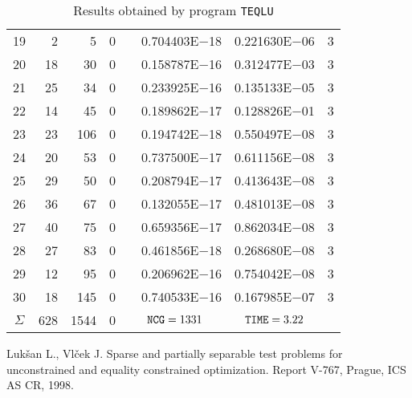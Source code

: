 \documentclass{esub2acm}
\begin{document}
\begin{table}
\begin{tabular}{c|rrrr@{}lcc}
19  &   2   &   5   &   0   &       &   0.704403E$-$18  &   0.221630E$-$06  &   3   \\
20  &   18  &   30  &   0   &       &   0.158787E$-$16  &   0.312477E$-$03  &   3   \\
21  &   25  &   34  &   0   &       &   0.233925E$-$16  &   0.135133E$-$05  &   3   \\
22  &   14  &   45  &   0   &       &   0.189862E$-$17  &   0.128826E$-$01  &   3   \\
23  &   23  &   106 &   0   &       &   0.194742E$-$18  &   0.550497E$-$08  &   3   \\
24  &   20  &   53  &   0   &       &   0.737500E$-$17  &   0.611156E$-$08  &   3   \\
25  &   29  &   50  &   0   &       &   0.208794E$-$17  &   0.413643E$-$08  &   3   \\
26  &   36  &   67  &   0   &       &   0.132055E$-$17  &   0.481013E$-$08  &   3   \\
27  &   40  &   75  &   0   &       &   0.659356E$-$17  &   0.862034E$-$08  &   3   \\
28  &   27  &   83  &   0   &       &   0.461856E$-$18  &   0.268680E$-$08  &   3   \\
29  &   12  &   95  &   0   &       &   0.206962E$-$16  &   0.754042E$-$08  &   3   \\
30  &   18  &   145 &   0   &       &   0.740533E$-$16  &   0.167985E$-$07  &   3   \\ \hline
$\Sigma$\rule[-2pt]{0pt}{12pt}  &  628 &   1544  &   0  & \multicolumn{2}{c}{${\tt NCG} = 1331$} & ${\tt TIME} = 3.22$ &  \\ \hline
\end{tabular}
\caption{Results obtained by program {\tt TEQLU}}
\label{teqlu}
\end{table}

\small
\begin{thebibliography}{99}

Luk\v{s}an L., Vl\v{c}ek J. Sparse and partially separable
test problems for unconstrained and equality constrained optimization.
Report V-767, Prague, ICS AS CR, 1998.

\end{thebibliography}
\end{document}
